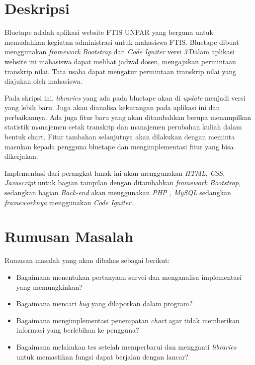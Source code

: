 \documentclass[a4paper,twoside]{article}
\begin{document}
\title{\@judultopik}
\author{\nama \textendash \@npm} 

\newcommand{\nama}{Stephen Hadi}
\newcommand{\@npm}{2017730016}
\newcommand{\@judultopik}{Analisa Kekurangan dan Implementasi Perbaikan Perangkat Lunak Bluetape} %
\newcommand{\jumpemb}{1} %
\newcommand{\tanggal}{20/09/2020}


\maketitle


\section{Deskripsi}
Bluetape adalah aplikasi website FTIS UNPAR yang berguna untuk memudahkan kegiatan administrasi untuk mahasiswa FTIS.
Bluetape dibuat menggunakan \textit{framework} \textit{Bootstrap} dan \textit{Code Igniter} versi \textit{3}.Dalam aplikasi website ini mahasiswa dapat melihat jadwal dosen, mengajukan permintaan transkrip nilai. Tata usaha dapat mengatur permintaan transkrip nilai yang diajukan oleh mahasiswa.

Pada skripsi ini, \textit{libraries} yang ada pada bluetape akan di \textit{update} menjadi versi yang lebih baru. Juga akan dianalisa kekurangan pada aplikasi ini dan perbaikannya. Ada juga fitur baru yang akan ditambahkan berupa menampilkan statistik manajemen cetak transkrip dan manajemen perubahan kuliah dalam bentuk chart. Fitur tambahan selanjutnya akan dilakukan dengan meminta masukan kepada pengguna bluetape dan mengimplementasi fitur yang bisa dikerjakan.

Implementasi dari perangkat lunak ini akan menggunakan \textit{HTML}, \textit{CSS}, \textit{Javascript} untuk bagian tampilan dengan ditambahkan \textit{framework Bootstrap}, sedangkan bagian \textit{Back-end} akan menggunakan \textit{PHP , MySQL} sedangkan \textit{frameworknya} menggunakan \textit{Code Igniter}.

\section{Rumusan Masalah}
Rumusan masalah yang akan dibahas sebagai berikut:
\begin{itemize}
	\item Bagaimana menentukan pertanyaan survei dan menganalisa implementasi yang memungkinkan?
	\item Bagaimana mencari \textit{bug} yang dilaporkan dalam program? 
	\item Bagaimana mengimplementasi penempatan \textit{chart} agar tidak memberikan informasi yang berlebihan ke pengguna?
	\item Bagaimana melakukan tes setelah memperbarui dan mengganti \textit{libraries} untuk memastikan fungsi dapat berjalan dengan lancar?

\end{itemize}
\end{document}
